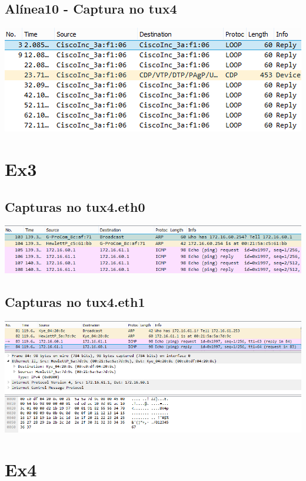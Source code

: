 \documentclass[11pt,a4paper,reqno]{report}
\numberwithin{equation}{section}
\begin{document}
\begin{appendices}
\subsection{Alínea10 - Captura no tux4}
\includegraphics[width=18cm]{ex2_a10_tux4.png}

\section{Ex3}%

\subsection{Capturas no tux4.eth0}
\label{ex3_eth0}
\includegraphics[width=18cm]{ex3_tux4eth0_ARP.png}

\subsection{Capturas no tux4.eth1}
\label{ex3_eth1}
\includegraphics[width=18cm]{ex3_tux4eth1_pingdetailed.png}

\section{Ex4}%


\end{appendices}
\end{document}

